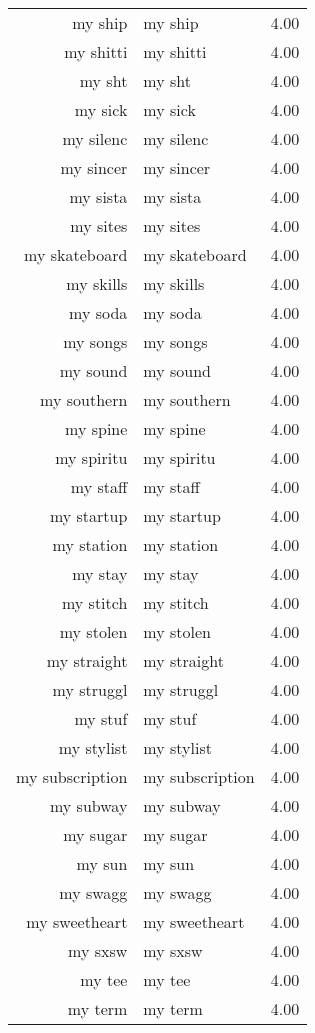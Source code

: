 \begin{table}[ht]
\begin{tabular}{rlr}
  my ship & my ship & 4.00 \\ 
  my shitti & my shitti & 4.00 \\ 
  my sht & my sht & 4.00 \\ 
  my sick & my sick & 4.00 \\ 
  my silenc & my silenc & 4.00 \\ 
  my sincer & my sincer & 4.00 \\ 
  my sista & my sista & 4.00 \\ 
  my sites & my sites & 4.00 \\ 
  my skateboard & my skateboard & 4.00 \\ 
  my skills & my skills & 4.00 \\ 
  my soda & my soda & 4.00 \\ 
  my songs & my songs & 4.00 \\ 
  my sound & my sound & 4.00 \\ 
  my southern & my southern & 4.00 \\ 
  my spine & my spine & 4.00 \\ 
  my spiritu & my spiritu & 4.00 \\ 
  my staff & my staff & 4.00 \\ 
  my startup & my startup & 4.00 \\ 
  my station & my station & 4.00 \\ 
  my stay & my stay & 4.00 \\ 
  my stitch & my stitch & 4.00 \\ 
  my stolen & my stolen & 4.00 \\ 
  my straight & my straight & 4.00 \\ 
  my struggl & my struggl & 4.00 \\ 
  my stuf & my stuf & 4.00 \\ 
  my stylist & my stylist & 4.00 \\ 
  my subscription & my subscription & 4.00 \\ 
  my subway & my subway & 4.00 \\ 
  my sugar & my sugar & 4.00 \\ 
  my sun & my sun & 4.00 \\ 
  my swagg & my swagg & 4.00 \\ 
  my sweetheart & my sweetheart & 4.00 \\ 
  my sxsw & my sxsw & 4.00 \\ 
  my tee & my tee & 4.00 \\ 
  my term & my term & 4.00 \\ 

\end{tabular}
\end{table}
